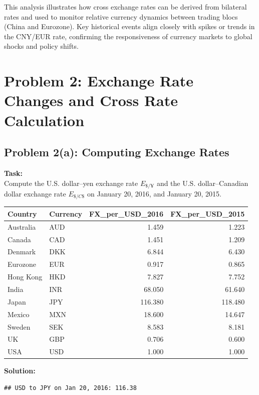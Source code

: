 \documentclass[
]{article}
\begin{document}
This analysis illustrates how cross exchange rates can be derived from
bilateral rates and used to monitor relative currency dynamics between
trading blocs (China and Eurozone). Key historical events align closely
with spikes or trends in the CNY/EUR rate, confirming the responsiveness
of currency markets to global shocks and policy shifts.

\section{Problem 2: Exchange Rate Changes and Cross Rate
Calculation}\label{problem-2-exchange-rate-changes-and-cross-rate-calculation}

\subsection{Problem 2(a): Computing Exchange
Rates}\label{problem-2a-computing-exchange-rates}

\textbf{Task:}\\
Compute the U.S. dollar--yen exchange rate \(E_{\$/¥}\) and the U.S.
dollar--Canadian dollar exchange rate \(E_{\$/C\$}\) on January 20,
2016, and January 20, 2015.

\begin{longtable}[]{@{}llrr@{}}
\toprule\noalign{}
Country & Currency & FX\_per\_USD\_2016 & FX\_per\_USD\_2015 \\
\midrule\noalign{}
\endhead
\bottomrule\noalign{}
\endlastfoot
Australia & AUD & 1.459 & 1.223 \\
Canada & CAD & 1.451 & 1.209 \\
Denmark & DKK & 6.844 & 6.430 \\
Eurozone & EUR & 0.917 & 0.865 \\
Hong Kong & HKD & 7.827 & 7.752 \\
India & INR & 68.050 & 61.640 \\
Japan & JPY & 116.380 & 118.480 \\
Mexico & MXN & 18.600 & 14.647 \\
Sweden & SEK & 8.583 & 8.181 \\
UK & GBP & 0.706 & 0.600 \\
USA & USD & 1.000 & 1.000 \\
\end{longtable}

\textbf{Solution:}

\begin{verbatim}
## USD to JPY on Jan 20, 2016: 116.38
\end{verbatim}
\end{document}
